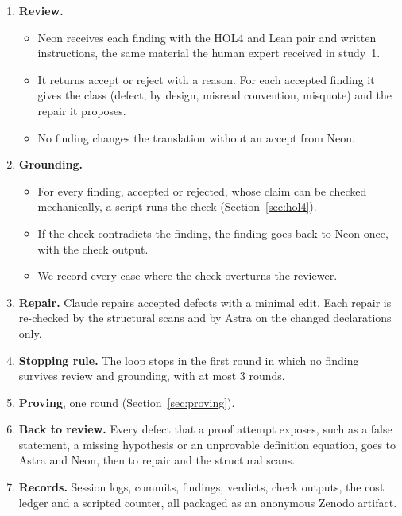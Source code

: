 \documentclass[11pt,a4paper]{article}
\begin{document}
\begin{enumerate}
\item \textbf{Review.}
\begin{itemize}
\item Neon receives each finding with the HOL4 and Lean pair and written instructions, the same material the human expert received in study~1.
\item It returns accept or reject with a reason. For each accepted finding it gives the class (defect, by design, misread convention, misquote) and the repair it proposes.
\item No finding changes the translation without an accept from Neon.
\end{itemize}

\item \textbf{Grounding.}
\begin{itemize}
\item For every finding, accepted or rejected, whose claim can be checked mechanically, a script runs the check (Section~\ref{sec:hol4}).
\item If the check contradicts the finding, the finding goes back to Neon once, with the check output.
\item We record every case where the check overturns the reviewer.
\end{itemize}

\item \textbf{Repair.} Claude repairs accepted defects with a minimal edit. Each repair is re-checked by the structural scans and by Astra on the changed declarations only.

\item \textbf{Stopping rule.} The loop stops in the first round in which no finding survives review and grounding, with at most 3 rounds.

\item \textbf{Proving}, one round (Section~\ref{sec:proving}).

\item \textbf{Back to review.} Every defect that a proof attempt exposes, such as a false statement, a missing hypothesis or an unprovable definition equation, goes to Astra and Neon, then to repair and the structural scans.

\item \textbf{Records.} Session logs, commits, findings, verdicts, check outputs, the cost ledger and a scripted counter, all packaged as an anonymous Zenodo artifact.
\end{enumerate}
\end{document}
